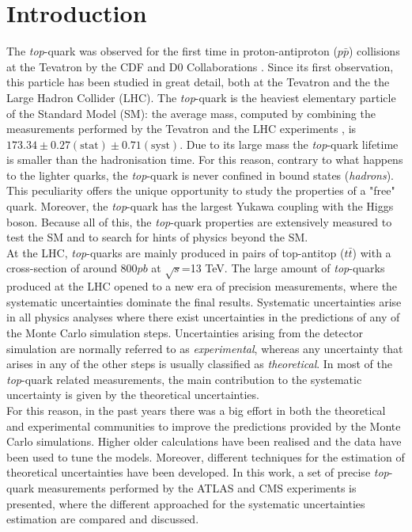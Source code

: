 \documentclass[12pt]{article}
\begin{document}
\section{Introduction}
The \emph{top}-quark was observed for the first time in proton-antiproton ($p\bar{p}$) collisions at the Tevatron by the CDF and D0 Collaborations %
\cite{Abe_1995,Abachi_1995}. Since its first observation, this particle has been studied in great detail, both at the Tevatron and the the Large Hadron Collider (LHC). The \emph{top}-quark is the heaviest elementary particle of the Standard Model (SM): the average mass, computed by combining the measurements performed by the Tevatron and the LHC experiments \cite{atlas2014combination}, is $173.34\pm0.27(\text{stat})\pm0.71(\text{syst})$.
Due to its large mass the \emph{top}-quark lifetime is smaller than the hadronisation time. For this reason, contrary to what happens to the lighter quarks, the \emph{top}-quark is never confined in bound states (\emph{hadrons}). This peculiarity offers the unique opportunity to study the properties of a "free" quark.
Moreover, the \emph{top}-quark has the largest Yukawa coupling with the Higgs boson. Because all of this, the \emph{top}-quark properties are extensively measured to test the SM and to search for hints of physics beyond the SM.\\ 
At the LHC, \emph{top}-quarks are mainly produced in pairs of top-antitop ($t\bar{t}$) with a cross-section of around 800$pb$ at $\sqrt{s}$=13 TeV.
The large amount of \emph{top}-quarks produced at the LHC opened to a new era of precision measurements, where the systematic uncertainties dominate the final results. Systematic uncertainties arise in all physics analyses where there exist uncertainties in the predictions of any of the Monte Carlo simulation steps. Uncertainties arising from the detector simulation are normally referred to as \emph{experimental}, whereas any uncertainty that arises in any of the other steps is usually classified as \emph{theoretical}. In most of the \emph{top}-quark related measurements, the main contribution to the systematic uncertainty is given by the theoretical uncertainties.\\
For this reason, in the past years there was a big effort in both the theoretical and experimental communities to improve the predictions provided by the Monte Carlo simulations. Higher older calculations have been realised and the data have been used to tune the models.
Moreover, different techniques for the estimation of theoretical uncertainties have been developed. In this work, a set of precise \emph{top}-quark measurements performed by the ATLAS and CMS experiments is presented, where the different approached for the systematic uncertainties estimation are compared and discussed.
\end{document}
